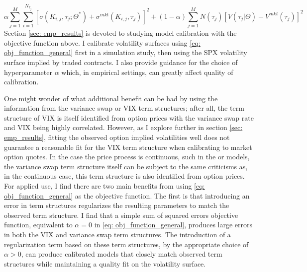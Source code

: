 \documentclass[12pt]{article}
\begin{document}
\begin{equation}\label{eq: obj_function_general}
 \alpha   \sum\limits_{j=1}^{M}\sum\limits_{i=1}^{N_{\tau_j}} \left[\sigma(K_{i,j}, \tau_j; \Theta^*) +  \sigma^{mkt}(K_{i,j}, \tau_j)\right]^2 + (1-\alpha) \sum\limits_{j=1}^{M} N(\tau_j) \left[V(\tau_j\vert \Theta) - V^{mkt}(\tau_j)\right]^2
\end{equation}
Section \ref{sec: emp_results} is devoted to studying model calibration with the objective function above. I calibrate volatility surfaces using \eqref{eq: obj_function_general} first in a simulation study, then using the SPX volatility surface implied by traded contracts. I also provide guidance for the choice of hyperparameter $\alpha$ which, in empirical settings, can greatly affect quality of calibration. 

One might wonder of what additional benefit can be had by using the information from the variance swap or VIX term structures; after all, the term structure of VIX is itself identified from option prices with the variance swap rate and VIX being highly correlated. However, as I explore further in section \ref{sec: emp_results}, fitting the observed option implied volatilities well does not guarantee a reasonable fit for the VIX term structure when calibrating to market option quotes. In the case the price process is continuous, such in the \cite{heston1993closed} or \cite{heath1992bond} models, the variance swap term structure itself can be subject to the same criticisms as, in the continuous case, this term structure is also identified from option prices. For applied use, I find there are two main benefits from using \eqref{eq: obj_function_general} as the objective function. The first is that introducing an error in term structures regularizes the resulting parameters to match the observed term structure. I find that a simple sum of squared errors objective function, equivalent to $\alpha = 0$ in \eqref{eq: obj_function_general}, produces large errors in both the VIX and variance swap term structures. The introduction of a regularization term based on these term structures, by the appropriate choice of $\alpha > 0$, can produce calibrated models that closely match observed term structures while maintaining a quality fit on the volatility surface.
\end{document}
